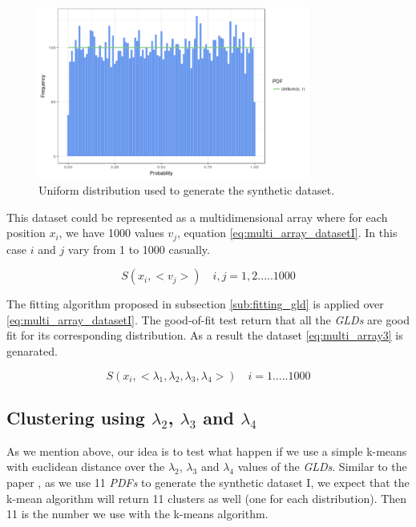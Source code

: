 \begin{figure}[H]
    \centering
    \includegraphics[width=0.8\textwidth]{img/gld_clustering/extra_images/uniform.png}
    \caption{Uniform distribution used to generate the synthetic dataset.}
    \label{fig:uniform}
\end{figure}

This dataset could be represented as a multidimensional array where for each position $x_{i}$, we have 1000 values $v_{j}$, equation \ref{eq:multi_array_datasetI}. In this case $i$ and $j$ vary from 1 to 1000 casually.

\begin{equation}\label{eq:multi_array_datasetI}
S(x_{i}, <v_{j}>) \quad i,j=1, 2.....1000
\end{equation}

The fitting algorithm proposed in subsection \ref{sub:fitting_gld} is applied over \ref{eq:multi_array_datasetI}. The good-of-fit test return that all the \textit{GLDs} are good fit for its corresponding distribution. As a result the dataset \ref{eq:multi_array3} is genarated. 

\begin{equation}\label{eq:multi_array3}
S(x_{i}, <\lambda_{1},\lambda_{2},\lambda_{3},\lambda_{4}>) \quad i=1.....1000
\end{equation}

\subsection{Clustering using $\lambda_{2}$, $\lambda_{3}$ and $\lambda_{4}$}\label{syntheticI_l234}

As we mention above, our idea is to test what happen if we use a simple k-means with euclidean distance over the $\lambda_{2}$, $\lambda_{3}$ and $\lambda_{4}$ values of the \textit{GLDs}. Similar to the paper \cite{Jiang2011}, as we use 11 \textit{PDFs} to generate the synthetic dataset I, we expect that the k-mean algorithm will return 11 clusters as well (one for each distribution). Then 11 is the number we use with the k-means algorithm.

